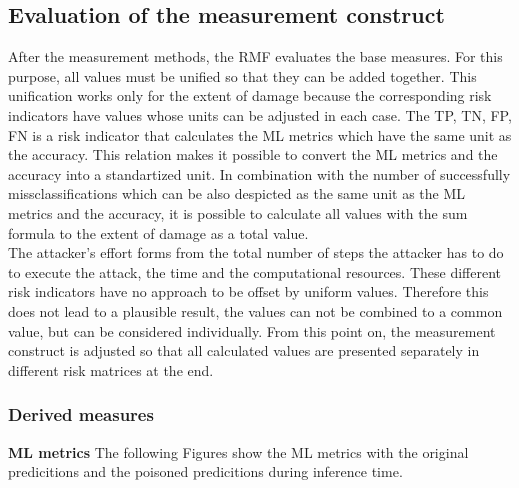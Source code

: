 \subsection{Evaluation of the measurement construct}

After the measurement methods, the RMF evaluates the base measures. For this purpose, all values must be unified so that they can be added together. This unification works only for the extent of damage because the corresponding risk indicators have values whose units can be adjusted in each case. The TP, TN, FP, FN is a risk indicator that calculates the ML metrics which have the same unit as the accuracy. This relation makes it possible to convert the ML metrics and the accuracy into a standartized unit. In combination with the number of successfully missclassifications which can be also despicted as the same unit as the ML metrics and the accuracy, it is possible to calculate all values with the sum formula to the extent of damage as a total value. \\
The attacker's effort forms from the total number of steps the attacker has to do to execute the attack, the time and the computational resources. These different risk indicators have no approach to be offset by uniform values. Therefore this does not lead to a plausible result, the values can not be combined to a common value, but can be considered individually. From this point on, the measurement construct is adjusted so that all calculated values are presented separately in different risk matrices at the end.

\subsubsection*{Derived measures}

\textbf{ML metrics} The following Figures show the ML metrics with the original predicitions and the poisoned predicitions during inference time.

